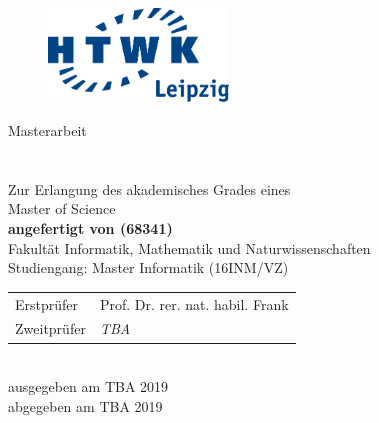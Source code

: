 \makeatletter
\begin{titlepage}
  \vspace{1cm}

  \begin{figure}[h!]
    \centering
    \includegraphics[height=2.5cm]{assets/htwk_logo.pdf}
  \end{figure}

  \begin{center}
    \vspace{1cm}

    \begin{onehalfspacing}
      {\Large Masterarbeit} \\[8ex]
      \textbf{
        {\Huge \@title} \\[5ex]
        {\Large \@subtitle} \\[8ex]
      }
      \large
      Zur Erlangung des akademisches Grades eines \\
      Master of Science \\[5ex]
      \vfill
      \textbf{angefertigt von \@author{ }(68341)}\\[5ex]
      \vfill
      Fakultät Informatik, Mathematik und Naturwissenschaften\\
      Studiengang: Master Informatik (16INM/VZ)\\[5ex]
      \vfill
      \begin{tabular}{ll}
          Erstprüfer & Prof. Dr. rer. nat. habil. Frank\\
          Zweitprüfer & \emph{TBA}
      \end{tabular} \\[5ex]
      \vfill
      ausgegeben am TBA 2019 \\
      abgegeben am TBA 2019
    \end{onehalfspacing}
  \end{center}
\end{titlepage}
\makeatother
